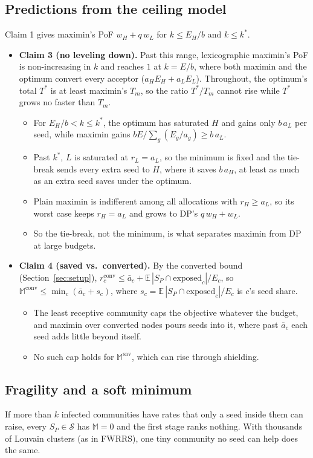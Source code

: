 \subsection{Predictions from the ceiling model}
Claim 1 gives maximin's PoF $w_H+q\,w_L$ for $k\le E_H/b$ and $k\le k^*$.
\begin{itemize}
\item \textbf{Claim 3 (no leveling down).} Past this range, lexicographic maximin's PoF is non-increasing in $k$ and reaches $1$ at $k=E/b$, where both maximin and the optimum convert every acceptor ($a_H E_H+a_L E_L$). Throughout, the optimum's total $T^*$ is at least maximin's $T_m$, so the ratio $T^*/T_m$ cannot rise while $T^*$ grows no faster than $T_m$.
  \begin{itemize}
  \item For $E_H/b<k\le k^*$, the optimum has saturated $H$ and gains only $b\,a_L$ per seed, while maximin gains $bE/\sum_g(E_g/a_g)\ge b\,a_L$.
  \item Past $k^*$, $L$ is saturated at $r_L=a_L$, so the minimum is fixed and the tie-break sends every extra seed to $H$, where it saves $b\,a_H$, at least as much as an extra seed saves under the optimum.
  \item Plain maximin is indifferent among all allocations with $r_H\ge a_L$, so its worst case keeps $r_H=a_L$ and grows to DP's $q\,w_H+w_L$.
  \item So the tie-break, not the minimum, is what separates maximin from DP at large budgets.
  \end{itemize}
\item \textbf{Claim 4 (saved vs.\ converted).} By the converted bound (Section~\ref{sec:setup}), $r_c^{\mathrm{conv}}\le\bar a_c+\mathbb{E}\,|S_P\cap\text{exposed}_c|/E_c$, so $\mathbb{M}^{\mathrm{conv}}\le\min_c(\bar a_c+s_c)$, where $s_c=\mathbb{E}\,|S_P\cap\text{exposed}_c|/E_c$ is $c$'s seed share.
  \begin{itemize}
  \item The least receptive community caps the objective whatever the budget, and maximin over converted nodes pours seeds into it, where past $\bar a_c$ each seed adds little beyond itself.
  \item No such cap holds for $\mathbb{M}^{\mathrm{sav}}$, which can rise through shielding.
  \end{itemize}
\end{itemize}

\subsection{Fragility and a soft minimum}
If more than $k$ infected communities have rates that only a seed inside them can raise, every $S_P\in\mathcal{S}$ has $\mathbb{M}=0$ and the first stage ranks nothing. With thousands of Louvain clusters (as in FWRRS), one tiny community no seed can help does the same.

